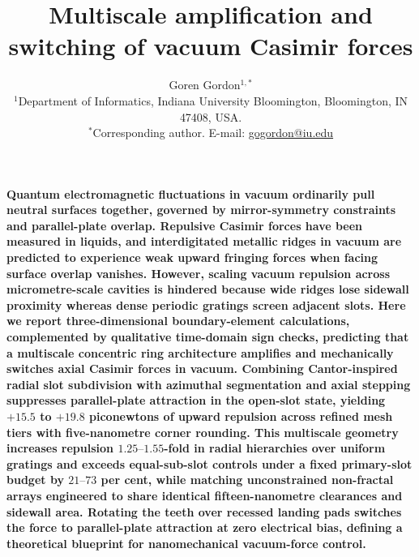 \documentclass[11pt, a4paper]{article}
\title{\textbf{Multiscale amplification and switching of vacuum Casimir forces}}
\author{Goren Gordon$^{1,*}$\\[6pt]
\small $^{1}$Department of Informatics, Indiana University Bloomington, Bloomington, IN 47408, USA.\\
\small $^{*}$Corresponding author. E-mail: \href{mailto:gogordon@iu.edu}{gogordon@iu.edu}}
\date{}
\begin{document}
\maketitle
\linenumbers
\doublespacing

\noindent\textbf{Quantum electromagnetic fluctuations in vacuum ordinarily pull neutral surfaces together, governed by mirror-symmetry constraints and parallel-plate overlap\cite{casimir1948,kennethklich2006}. Repulsive Casimir forces have been measured in liquids\cite{munday2009}, and interdigitated metallic ridges in vacuum are predicted to experience weak upward fringing forces when facing surface overlap vanishes\cite{levin2010,rodriguez2011}. However, scaling vacuum repulsion across micrometre-scale cavities is hindered because wide ridges lose sidewall proximity whereas dense periodic gratings screen adjacent slots. Here we report three-dimensional boundary-element calculations, complemented by qualitative time-domain sign checks, predicting that a multiscale concentric ring architecture amplifies and mechanically switches axial Casimir forces in vacuum. Combining Cantor-inspired radial slot subdivision with azimuthal segmentation and axial stepping suppresses parallel-plate attraction in the open-slot state, yielding $+15.5$ to $+19.8$ piconewtons of upward repulsion across refined mesh tiers with five-nanometre corner rounding. This multiscale geometry increases repulsion $1.25\text{--}1.55$-fold in radial hierarchies over uniform gratings and exceeds equal-sub-slot controls under a fixed primary-slot budget by $21\text{--}73$ per cent, while matching unconstrained non-fractal arrays engineered to share identical fifteen-nanometre clearances and sidewall area. Rotating the teeth over recessed landing pads switches the force to parallel-plate attraction at zero electrical bias, defining a theoretical blueprint for nanomechanical vacuum-force control.}

\vspace{12pt}
\end{document}
